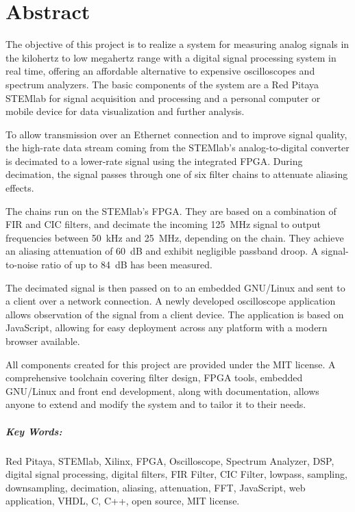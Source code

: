 %
%
\chapter*{Abstract} %
\label{ch:app:abstract}

The objective  of this  project is  to realize a  system for  measuring analog
signals  in  the kilohertz  to  low  megahertz  range  with a  digital  signal
processing  system  in  real  time,  offering  an  affordable  alternative  to
expensive oscilloscopes  and spectrum  analyzers. The basic components  of the
system are a  Red Pitaya STEMlab for signal acquisition  and processing  and a
personal  computer  or  mobile  device  for  data  visualization  and  further
analysis.

To  allow transmission  over  an  Ethernet connection  and  to improve  signal
quality, the high-rate data stream coming from the STEMlab's analog-to-digital
converter  is   decimated  to  a   lower-rate  signal  using   the  integrated
FPGA. During decimation, the signal passes through one of six filter chains to
attenuate aliasing  effects. 

The chains  run on  the STEMlab's  FPGA. They are based  on a  combination of
FIR  and CIC  filters,  and  decimate the  incoming  \SI{125}{\MHz} signal  to
output frequencies  between \SI{50}{\kHz} and \SI{25}{\MHz},  depending on the
chain. They  achieve  an  aliasing  attenuation of  \SI{60}{\dB}  and  exhibit
negligible passband droop. A  signal-to-noise ratio of up  to \SI{84}{\dB} has
been measured.

The decimated signal is then passed on  to an embedded GNU/Linux and sent to a
client over  a network connection. A newly  developed oscilloscope application
allows observation  of the signal  from a  client device.  The  application is
based on JavaScript,  allowing for easy deployment across any  platform with a
modern browser available.

All components created for this project  are provided under the MIT license. A
comprehensive toolchain covering filter design, FPGA tools, embedded GNU/Linux
and front end  development, along with documentation, allows  anyone to extend
and modify the system and to tailor it to their needs.

\vfill

\paragraph{Key Words:} 
Red Pitaya,
STEMlab,
Xilinx,
FPGA,
Oscilloscope,
Spectrum Analyzer,
DSP,
digital signal processing,
digital filters,
FIR Filter,
CIC Filter,
lowpass,
sampling,
downsampling,
decimation,
aliasing,
attenuation,
FFT,
JavaScript,
web application,
VHDL,
C,
C++,
open source,
MIT license.
